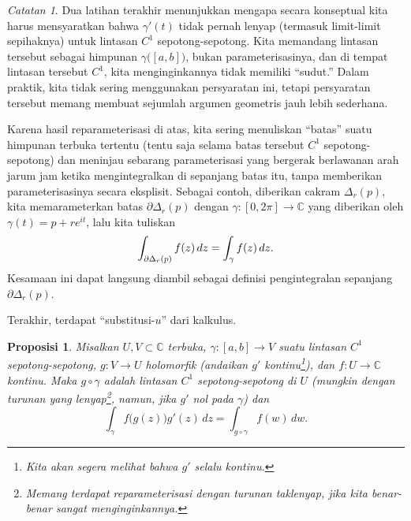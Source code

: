 \documentclass[12pt,openany]{book}
\newcommand{\avoidbreak}{\postdisplaypenalty=100}
\newcommand{\C}{{\mathbb{C}}}
\newcommand{\myquote}[1]{``#1''}
\theoremstyle{plain}
\newtheorem{prop}[thm]{Proposisi}
\theoremstyle{remark}
\newtheorem{remark}[thm]{Catatan}
\theoremstyle{definition}
\theoremstyle{exercise}
\theoremstyle{example}
\begin{document}
\begin{remark}
Dua latihan terakhir menunjukkan mengapa secara konseptual kita harus
mensyaratkan bahwa $\gamma'(t)$ tidak pernah lenyap (termasuk limit-limit sepihaknya)
untuk lintasan $C^1$ sepotong-sepotong.
Kita memandang lintasan tersebut
sebagai himpunan
$\gamma\bigl([a,b]\bigr)$,
bukan parameterisasinya, dan di tempat lintasan tersebut $C^1$,
kita menginginkannya tidak memiliki \myquote{sudut.}
Dalam praktik, kita tidak sering menggunakan persyaratan ini,
tetapi persyaratan tersebut memang membuat sejumlah argumen geometris jauh lebih sederhana.
\end{remark}

Karena hasil reparameterisasi di atas,
kita sering menuliskan \myquote{batas} suatu himpunan terbuka tertentu
(tentu saja selama batas tersebut $C^1$ sepotong-sepotong)
dan meninjau sebarang parameterisasi yang bergerak berlawanan arah jarum jam
ketika mengintegralkan di sepanjang batas itu, tanpa memberikan parameterisasinya secara eksplisit.
Sebagai contoh, diberikan cakram $\Delta_r(p)$, kita memarameterkan
batas $\partial \Delta_r(p)$ dengan
$\gamma  \colon [0,2\pi] \to \C$ yang diberikan oleh $\gamma(t) = p +
re^{it}$, lalu kita tuliskan
%
\begin{equation*}
\int_{\partial \Delta_r(p)} f(z) \, dz
=
\int_{\gamma} f(z) \, dz .
\avoidbreak
\end{equation*}
Kesamaan ini dapat langsung diambil sebagai definisi pengintegralan sepanjang
$\partial \Delta_r(p)$.

Terakhir, terdapat \myquote{substitusi-$u$} dari kalkulus.

\begin{prop} \label{prop:usubst}
Misalkan $U,V \subset \C$ terbuka, $\gamma \colon [a,b] \to V$ suatu
lintasan $C^1$ sepotong-sepotong, $g \colon V \to U$ holomorfik (andaikan $g'$
kontinu\footnote{Kita akan segera melihat bahwa $g'$ selalu kontinu.}), dan $f \colon U \to \C$
kontinu.  Maka $g \circ \gamma$ adalah lintasan $C^1$ sepotong-sepotong di $U$
(mungkin dengan turunan yang lenyap\footnote{%
Memang terdapat reparameterisasi dengan turunan taklenyap, jika kita benar-benar
sangat menginginkannya.},
namun, jika $g'$ nol pada $\gamma$) dan
\begin{equation*}
\int_{\gamma} f\bigl(g(z)\bigr) g'(z) \, dz
=
\int_{g \circ \gamma} f(w) \, dw .
\end{equation*}
\end{prop}
\end{document}
